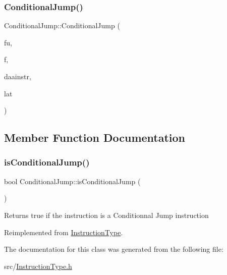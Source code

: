 \subsubsection{\texorpdfstring{Conditional\+Jump()}{ConditionalJump()}}
{\footnotesize\ttfamily Conditional\+Jump\+::\+Conditional\+Jump (\begin{DoxyParamCaption}\item[{const string \&}]{fu,  }\item[{const set$<$ \hyperlink{classInstructionFormat}{Instruction\+Format} $\ast$$>$ \&}]{f,  }\item[{\hyperlink{classDAAInstruction}{D\+A\+A\+Instruction} $\ast$}]{daainstr,  }\item[{int}]{lat }\end{DoxyParamCaption})}



\subsection{Member Function Documentation}
\mbox{\label{classConditionalJump_a2341c5b034b189c24b858651a51d6dba}} 
\subsubsection{\texorpdfstring{is\+Conditional\+Jump()}{isConditionalJump()}}
{\footnotesize\ttfamily bool Conditional\+Jump\+::is\+Conditional\+Jump (\begin{DoxyParamCaption}{ }\end{DoxyParamCaption})\hspace{0.3cm}{\ttfamily [virtual]}}

Returns true if the instruction is a Conditionnal Jump instruction 

Reimplemented from \hyperlink{classInstructionType_a3655591172fa6acbf7b9888e879b551d}{Instruction\+Type}.



The documentation for this class was generated from the following file\+:\begin{DoxyCompactItemize}
\item 
src/\hyperlink{InstructionType_8h}{Instruction\+Type.\+h}\end{DoxyCompactItemize}
